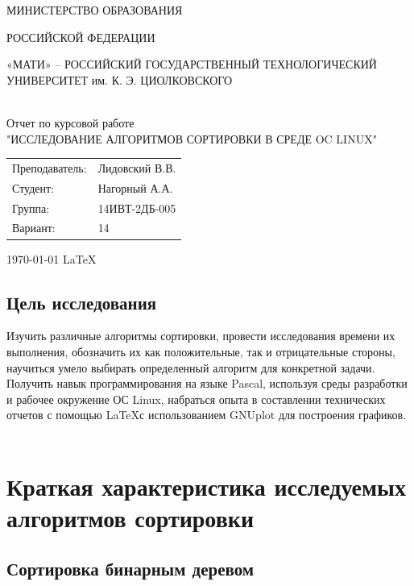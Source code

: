 \documentclass[a4paper,11pt]{article}
\begin{document}
\begin{titlepage} 

\begin{center} 
\large МИНИСТЕРСТВО ОБРАЗОВАНИЯ

РОССИЙСКОЙ ФЕДЕРАЦИИ

«МАТИ» – РОССИЙСКИЙ ГОСУДАРСТВЕННЫЙ
ТЕХНОЛОГИЧЕСКИЙ УНИВЕРСИТЕТ им. К. Э. ЦИОЛКОВСКОГО

\hline
\\[4.5cm]
\huge Отчет по курсовой работе \\[0.6cm] 
\large "ИССЛЕДОВАНИЕ АЛГОРИТМОВ СОРТИРОВКИ В СРЕДЕ OC LINUX"\\[5cm]
\begin{flushright}
\begin{tabular}{l l}
Преподаватель:&  Лидовский В.В.\\
Студент: &  Нагорный А.А.\\
Группа: & 14ИВТ-2ДБ-005\\
Вариант: & 14\\
\end{tabular}
\end{flushright}
\vfill 

{\large \today} 
{\large \LaTeX} 

\end{center} 

\thispagestyle{empty} 
\end{titlepage} 


\tableofcontents
\vfill
\begin{center}
\section{Цель исследования}
\end{center}
  Изучить различные алгоритмы сортировки, провести исследования  времени их выполнения, обозначить их как положительные, так и отрицательные стороны, 
научиться умело выбирать определенный алгоритм для конкретной задачи. Получить навык программирования на языке Pascal, 
используя среды разработки и рабочее окружение ОС Linux, набраться опыта в составлении технических отчетов с  помощью \LaTeX с использованием GNUplot для построения графиков.
\\
\\
\section{Краткая характеристика исследуемых алгоритмов сортировки}
\begin{center}
  \subsection{	Сортировка бинарным деревом}
\end{center}
\end{document}
